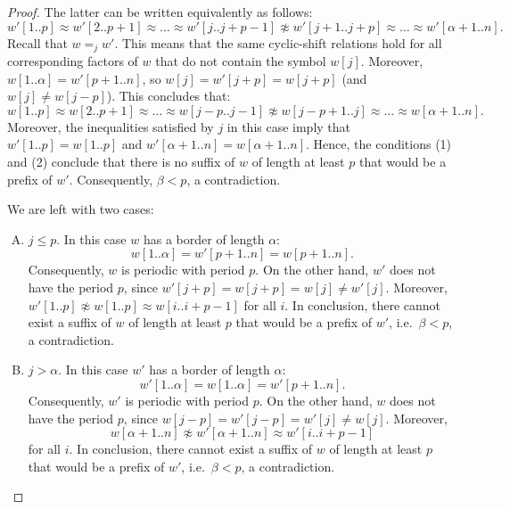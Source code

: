 \documentclass{article}
\begin{document}
\begin{proof}
    The latter can be written equivalently as follows:
    \begin{equation}\label{eq:w1}
      w'[1..p] \approx w'[2..p+1] \approx \ldots \approx w'[j..j+p-1] \not\approx w'[j+1..j+p] \approx \ldots \approx w'[\alpha+1..n].
    \end{equation}
    Recall that $w =_j w'$.
    This means that the same cyclic-shift relations hold for all corresponding factors of $w$ that do not contain
    the symbol $w[j]$.
    Moreover, $w[1..\alpha] = w'[p+1..n]$, so $w[j] = w'[j+p] = w[j+p]$ (and $w[j] \ne w[j-p]$).
    This concludes that:
    \begin{equation}\label{eq:w}
      w[1..p] \approx w[2..p+1] \approx \ldots \approx w[j-p..j-1] \not\approx w[j-p+1..j] \approx \ldots \approx w[\alpha+1..n].
    \end{equation}
    Moreover, the inequalities satisfied by $j$ in this case imply that $w'[1..p] = w[1..p]$ and $w'[\alpha+1..n] = w[\alpha+1..n]$.
    Hence, the conditions (1) and (2) conclude that there is no suffix of $w$ of length at least $p$ that would be
    a prefix of $w'$.
    Consequently, $\beta<p$, a contradiction.
    
    We are left with two cases:
    \begin{enumerate}[(A)]
      \item $j \le p$.
        In this case $w$ has a border of length $\alpha$:
        $$w[1..\alpha] = w'[p+1..n] = w[p+1..n].$$
        Consequently, $w$ is periodic with period $p$.
        On the other hand, $w'$ does not have the period $p$, since $w'[j+p] = w[j+p] = w[j] \ne w'[j]$.
        Moreover, $w'[1..p] \not \approx w[1..p] \approx w[i..i+p-1]$ for all $i$.
        In conclusion, there cannot exist a suffix of $w$ of length at least $p$ that would be a prefix of $w'$,
        i.e.\ $\beta<p$, a contradiction.

      \item $j>\alpha$.
        In this case $w'$ has a border of length $\alpha$:
        $$w'[1..\alpha] = w[1..\alpha] = w'[p+1..n].$$
        Consequently, $w'$ is periodic with period $p$.
        On the other hand, $w$ does not have the period $p$, since $w[j-p] = w'[j-p] = w'[j] \ne w[j]$.
        Moreover,
        $$w[\alpha+1..n] \not \approx w'[\alpha+1..n] \approx w'[i..i+p-1]$$
        for all $i$.
        In conclusion, there cannot exist a suffix of $w$ of length at least $p$ that would be a prefix of $w'$,
        i.e.\ $\beta<p$, a contradiction.\qedhere
    \end{enumerate}
  \end{proof}
\end{document}
